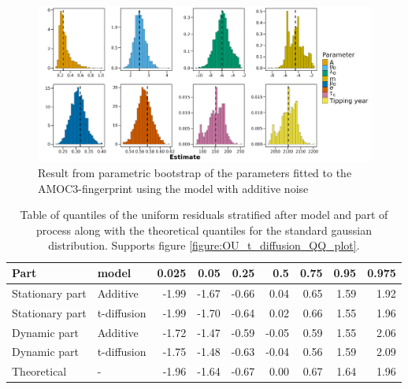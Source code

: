 \begin{figure}[h!]
    \begin{center}
        \includegraphics[scale = .09]{figures/estim_tibble_AMOC3_plot.jpeg}
        \caption{Result from parametric bootstrap of the parameters fitted to the AMOC3-fingerprint using the model with additive noise}
        \label{figure:AMOC3_additive_bootstrap}
    \end{center}
\end{figure}
\begin{table}[ht]
    \centering
    \begin{tabular}{llrrrrrrr}
      \hline
    Part & model & 0.025 & 0.05 & 0.25 & 0.5 & 0.75 & 0.95 & 0.975 \\ 
      \hline
    Stationary part & Additive & -1.99 & -1.67 & -0.66 & 0.04 & 0.65 & 1.59 & 1.92 \\ 
      Stationary part & t-diffusion & -1.99 & -1.70 & -0.64 & 0.02 & 0.66 & 1.55 & 1.96 \\ 
      Dynamic part & Additive & -1.72 & -1.47 & -0.59 & -0.05 & 0.59 & 1.55 & 2.06 \\ 
      Dynamic part & t-diffusion & -1.75 & -1.48 & -0.63 & -0.04 & 0.56 & 1.59 & 2.09 \\ 
      Theoretical & - & -1.96 & -1.64 & -0.67 & 0.00 & 0.67 & 1.64 & 1.96 \\ 
       \hline
    \end{tabular}
    \caption{Table of quantiles of the uniform residuals stratified after model and part of process along with the theoretical quantiles for the standard gaussian distribution. Supports figure \ref{figure:OU_t_diffusion_QQ_plot}.}
    \label{table:QQ_OU_vs_t_diffusion}
\end{table}

\newpage
